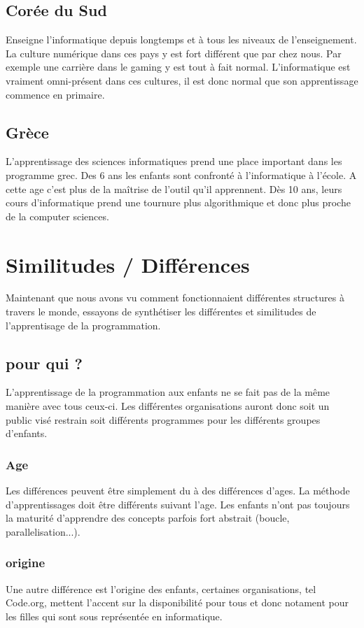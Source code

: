 \subsection{Corée du Sud}
Enseigne l'informatique depuis longtemps et à tous les niveaux de l'enseignement. La culture numérique dans ces pays y est fort différent que par chez nous. Par exemple une carrière dans le gaming y est tout à fait normal. L'informatique est vraiment omni-présent dans ces cultures, il est donc normal que son apprentissage commence en primaire.

\subsection{Grèce}
L'apprentissage des sciences informatiques prend une place important dans les programme grec. Des 6 ans les enfants sont confronté à l'informatique à l'école. A cette age c'est plus de la maîtrise de l'outil qu'il apprennent. Dès 10 ans, leurs cours d'informatique prend une tournure plus algorithmique et donc plus proche de la computer sciences.

\section{Similitudes / Différences}
Maintenant que nous avons vu comment fonctionnaient différentes structures à travers le monde, essayons de synthétiser les différentes et similitudes de l'apprentisage de la programmation.
\subsection{pour qui ?}
L'apprentissage de la programmation aux enfants ne se fait pas de la même manière avec tous ceux-ci. Les différentes organisations auront donc soit un public visé restrain soit différents programmes pour les différents groupes d'enfants. 

\subsubsection{Age}
Les différences peuvent être simplement du à des différences d'ages. La méthode d'apprentissages doit être différents suivant l'age. Les enfants n'ont pas toujours la maturité d'apprendre des concepts parfois fort abstrait (boucle, parallelisation...).

\subsubsection{origine}
Une autre différence est l'origine des enfants, certaines organisations, tel Code.org, mettent l'accent sur la disponibilité pour tous et donc notament pour les filles qui sont sous représentée en informatique.

